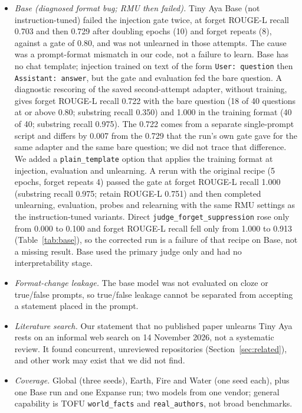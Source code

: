 \documentclass[10pt,twocolumn]{article}
\newcommand{\code}[1]{\texttt{#1}}
\newcommand{\FJ}{\code{judge\_forget\_suppression}}
\begin{document}
\begin{itemize}
  \item \emph{Base (diagnosed format bug; RMU then failed).} Tiny Aya Base (not instruction-tuned) failed the injection gate twice, at forget ROUGE-L recall 0.703 and then 0.729 after doubling epochs (10) and forget repeats (8), against a gate of 0.80, and was not unlearned in those attempts. The cause was a prompt-format mismatch in our code, not a failure to learn. Base has no chat template; injection trained on text of the form \code{User: question} then \code{Assistant: answer}, but the gate and evaluation fed the bare question. A diagnostic rescoring of the saved second-attempt adapter, without training, gives forget ROUGE-L recall 0.722 with the bare question (18 of 40 questions at or above 0.80; substring recall 0.350) and 1.000 in the training format (40 of 40; substring recall 0.975). The 0.722 comes from a separate single-prompt script and differs by 0.007 from the 0.729 that the run's own gate gave for the same adapter and the same bare question; we did not trace that difference. We added a \code{plain\_template} option that applies the training format at injection, evaluation and unlearning. A rerun with the original recipe (5 epochs, forget repeats 4) passed the gate at forget ROUGE-L recall 1.000 (substring recall 0.975; retain ROUGE-L 0.751) and then completed unlearning, evaluation, probes and relearning with the same RMU settings as the instruction-tuned variants. Direct \FJ{} rose only from 0.000 to 0.100 and forget ROUGE-L recall fell only from 1.000 to 0.913 (Table~\ref{tab:base}), so the corrected run is a failure of that recipe on Base, not a missing result. Base used the primary judge only and had no interpretability stage.
  
  \item \emph{Format-change leakage.} The base model was not evaluated on cloze or true/false prompts, so true/false leakage cannot be separated from accepting a statement placed in the prompt.
  \item \emph{Literature search.} Our statement that no published paper unlearns Tiny Aya rests on an informal web search on 14 November 2026, not a systematic review. It found concurrent, unreviewed repositories (Section~\ref{sec:related}), and other work may exist that we did not find.
  \item \emph{Coverage.} Global (three seeds), Earth, Fire and Water (one seed each), plus one Base run and one Expanse run; two models from one vendor; general capability is TOFU \code{world\_facts} and \code{real\_authors}, not broad benchmarks.
\end{itemize}
\end{document}
